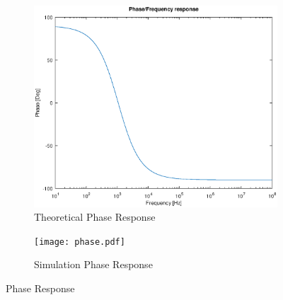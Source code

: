 \begin{figure}[H]
\centering
\begin{subfigure}{.5\textwidth}
    \centering
    \vspace{2.8 cm}
    \includegraphics[scale=0.4]{phase_response.eps}
    \caption{Theoretical Phase Response}
\end{subfigure}%
\begin{subfigure}{.5\textwidth}
    \centering
    \texttt{[image: phase.pdf]}
    \caption{Simulation Phase Response}
\end{subfigure}
\caption{Phase Response}
\label{fig:comp1}
\end{figure}

